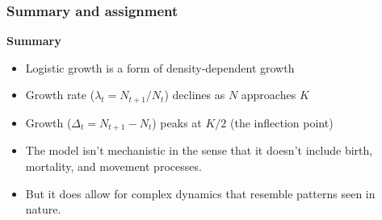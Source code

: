 \documentclass[color=usenames,dvipsnames]{beamer}\usepackage[]{graphicx}\usepackage[]{xcolor}
\begin{document}





\begin{frame}
  \frametitle{Summary and assignment}
  \large
  {\bf Summary}
  \begin{itemize}[<+->]
    \item Logistic growth is a form of density-dependent growth
    \item Growth rate ($\lambda_t=N_{t+1}/N_t$) declines as $N$ approaches $K$
    \item Growth ($\Delta_t=N_{t+1}-N_t$) peaks at $K/2$ (the
      inflection point)
    \item The model isn't mechanistic in the sense that it doesn't
      include birth, mortality, and movement processes. 
    \item But it does allow for complex dynamics that resemble
      patterns seen in nature.
  \end{itemize}
  \vfill
\end{frame}
\end{document}

